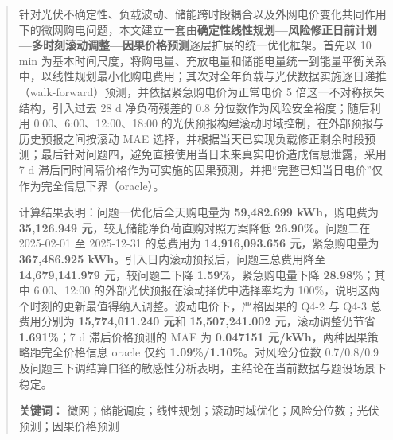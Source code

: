 \begin{abstract}
针对光伏不确定性、负载波动、储能跨时段耦合以及外网电价变化共同作用下的微网购电问题，本文建立一套由\textbf{确定性线性规划---风险修正日前计划---多时刻滚动调整---因果价格预测}逐层扩展的统一优化框架。首先以 10 min 为基本时间尺度，将购电量、充放电量和储能电量统一到能量平衡关系中，以线性规划最小化购电费用；其次对全年负载与光伏数据实施逐日递推（walk-forward）预测，并依据紧急购电价为正常电价 5 倍这一不对称损失结构，引入过去 28 d 净负荷残差的 0.8 分位数作为风险安全裕度；随后利用 0:00、6:00、12:00、18:00 的光伏预报构建滚动时域控制，在外部预报与历史预报之间按滚动 MAE 选择，并根据当天已实现负载修正剩余时段预测；最后针对问题四，避免直接使用当日未来真实电价造成信息泄露，采用 7 d 滞后同时间隔价格作为可实施的因果预测，并把``完整已知当日电价''仅作为完全信息下界（oracle）。

计算结果表明：问题一优化后全天购电量为 \textbf{59,482.699 kWh}，购电费为 \textbf{35,126.949 元}，较无储能净负荷直购对照方案降低 \textbf{26.90\%}。问题二在 2025-02-01 至 2025-12-31 的总费用为 \textbf{14,916,093.656 元}，紧急购电量为 \textbf{367,486.925 kWh}。引入日内滚动预报后，问题三总费用降至 \textbf{14,679,141.979 元}，较问题二下降 \textbf{1.59\%}，紧急购电量下降 \textbf{28.98\%}；其中 6:00、12:00 的外部光伏预报在滚动择优中选择率均为 100\%，说明这两个时刻的更新最值得纳入调整。波动电价下，严格因果的 Q4-2 与 Q4-3 总费用分别为 \textbf{15,774,011.240 元}和 \textbf{15,507,241.002 元}，滚动调整仍节省 \textbf{1.691\%}；7 d 滞后价格预测的 MAE 为 \textbf{0.047151 元/kWh}，两种因果策略距完全价格信息 oracle 仅约 \textbf{1.09\%/1.10\%}。对风险分位数 0.7/0.8/0.9 及问题三下调结算口径的敏感性分析表明，主结论在当前数据与题设场景下稳定。

\textbf{关键词：} 微网；储能调度；线性规划；滚动时域优化；风险分位数；光伏预测；因果价格预测
\end{abstract}
